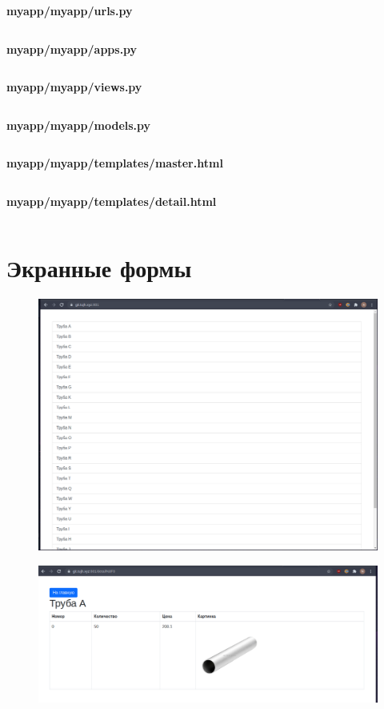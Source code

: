 \documentclass[20pt,a4paper]{report}
\begin{document}
		\qquad \textbf{myapp/myapp/urls.py} \\
		\small
		\inputminted[tabsize=4, linenos, breaklines]{python}{myapp/myapp/urls.py}
		\large
		
		\qquad \textbf{myapp/myapp/apps.py} \\
		\small
		\inputminted[tabsize=4, linenos, breaklines]{python}{myapp/myapp/apps.py}
		\large
		
		\qquad \textbf{myapp/myapp/views.py} \\
		\small
		\inputminted[tabsize=4, linenos, breaklines]{python}{myapp/myapp/views.py}
		\large
		
		\qquad \textbf{myapp/myapp/models.py} \\
		\small
		\inputminted[tabsize=4, linenos, breaklines]{python}{myapp/myapp/models.py}
		\large
		
		\qquad \textbf{myapp/myapp/templates/master.html} \\
		\small
		\inputminted[tabsize=4, linenos, breaklines]{html}{myapp/myapp/templates/master.html}
		\large
		
		\qquad \textbf{myapp/myapp/templates/detail.html} \\
		\small
		\inputminted[tabsize=4, linenos, breaklines]{html}{myapp/myapp/templates/detail.html}
		\large
		
	\chapter{Экранные формы}
		\begin{figure}[H]
			\includegraphics[width=\textwidth]{1.png}
		\end{figure}
		\begin{figure}[H]
			\includegraphics[width=\textwidth]{2.png}
		\end{figure}
\end{document}
